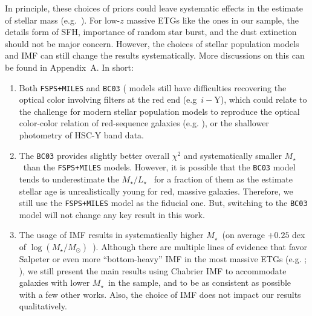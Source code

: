 \documentclass[preprint]{aastex}
\def\logms{{$\log (M_{\star}/M_{\odot})$}~}
\def\mstar{{$M_{\star}$}~}
\def\m2l{{$M_{\star}/L_{\star}$}~}
\begin{document}
\begin{CJK*}{UTF8}{gbsn}
    In principle, these choices of priors could leave systematic effects in 
    the estimate of stellar mass (e.g.\ \citealt{Bernardi2016b}). 
    For low-$z$ massive ETGs like the ones in our sample, the details form of 
    SFH, importance of random star burst, and the dust extinction should not be 
    major concern.  
    However, the choices of stellar population models and IMF can still 
    change the results systematically. 
    More discussions on this can be found in Appendix~A. 
    In short: 
    \begin{enumerate}
        \item Both \texttt{FSPS+MILES} and \texttt{BC03} (\citealt{BC03} models 
            still have difficulties recovering the optical color involving filters 
            at the red end (e.g~$i-$Y), which could relate to the challenge for 
            modern stellar population models to reproduce the optical color-color 
            relation of red-sequence galaxies (e.g. \citealt{MIUSCAT2}), or the 
            shallower photometry of HSC-Y band data. 
        \item The \texttt{BC03} provides slightly better overall ${\chi}^2$ and 
            systematically smaller \mstar than the \texttt{FSPS+MILES} models.  
            However, it is possible that the \texttt{BC03} model tends to 
            underestimate the \m2l for a fraction of them as the estimate 
            stellar age is unrealistically young for red, massive galaxies.  
            Therefore, we still use the \texttt{FSPS+MILES} model as the fiducial 
            one.  But, switching to the \texttt{BC03} model will not change any 
            key result in this work. 
        \item The usage of \citet{Salpeter1955} IMF results in systematically 
            higher \mstar (on average $+0.25$ dex of \logms).  
            Although there are multiple lines of evidence that favor Salpeter 
            or even more ``bottom-heavy'' IMF in the most massive ETGs 
            (e.g. \citealt{Conroy2012}; \citealt{Cappellari2012}), we still 
            present the main results using Chabrier IMF to accommodate galaxies 
            with lower \mstar in the sample, and to be as consistent as possible 
            with a few other works.  
            Also, the choice of IMF does not impact our results qualitatively.     
    \end{enumerate}
    

\end{CJK*}
\end{document}
